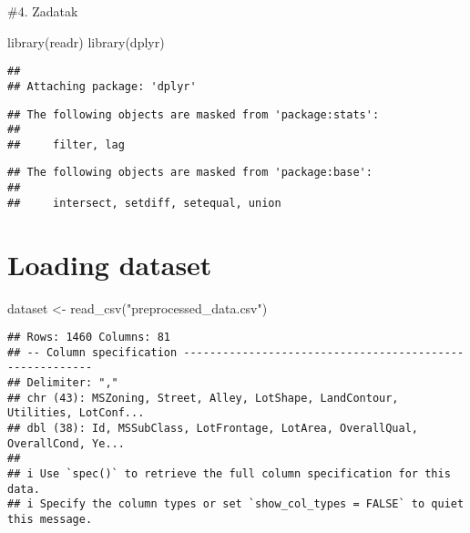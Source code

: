 \documentclass[
]{article}
\author{}
\date{\vspace{-2.5em}}
\newenvironment{Shaded}{\begin{snugshade}}{\end{snugshade}}
\newcommand{\FunctionTok}[1]{\textcolor[rgb]{0.00,0.00,0.00}{#1}}
\newcommand{\NormalTok}[1]{#1}
\newcommand{\OtherTok}[1]{\textcolor[rgb]{0.56,0.35,0.01}{#1}}
\newcommand{\StringTok}[1]{\textcolor[rgb]{0.31,0.60,0.02}{#1}}
\begin{document}
\#4. Zadatak

\begin{Shaded}
\begin{Highlighting}[]
\FunctionTok{library}\NormalTok{(readr)}
\FunctionTok{library}\NormalTok{(dplyr)}
\end{Highlighting}
\end{Shaded}

\begin{verbatim}
## 
## Attaching package: 'dplyr'
\end{verbatim}

\begin{verbatim}
## The following objects are masked from 'package:stats':
## 
##     filter, lag
\end{verbatim}

\begin{verbatim}
## The following objects are masked from 'package:base':
## 
##     intersect, setdiff, setequal, union
\end{verbatim}

\hypertarget{loading-dataset}{%
\section{Loading dataset}\label{loading-dataset}}

\begin{Shaded}
\begin{Highlighting}[]
\NormalTok{dataset }\OtherTok{\textless{}{-}} \FunctionTok{read\_csv}\NormalTok{(}\StringTok{"preprocessed\_data.csv"}\NormalTok{)}
\end{Highlighting}
\end{Shaded}

\begin{verbatim}
## Rows: 1460 Columns: 81
## -- Column specification --------------------------------------------------------
## Delimiter: ","
## chr (43): MSZoning, Street, Alley, LotShape, LandContour, Utilities, LotConf...
## dbl (38): Id, MSSubClass, LotFrontage, LotArea, OverallQual, OverallCond, Ye...
## 
## i Use `spec()` to retrieve the full column specification for this data.
## i Specify the column types or set `show_col_types = FALSE` to quiet this message.
\end{verbatim}
\end{document}
